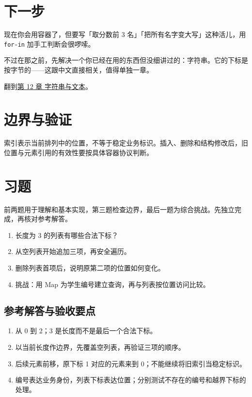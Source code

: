 \section{下一步}

现在你会用容器了，但要写「取分数前 3 名」「把所有名字变大写」这种活儿，用 \texttt{for-in} 加手工判断会很啰嗦。

不过在那之前，先解决一个你已经在用的东西但没细讲过的：字符串。它的下标是按字节的——这跟中文直接相关，值得单独一章。

翻到\hyperref[ch:12]{第 12 章 字符串与文本}。

\section{边界与验证}

索引表示当前排列中的位置，不等于稳定业务标识。插入、删除和结构修改后，旧位置与元素引用的有效性要按具体容器协议判断。

\section{习题}

前两题用于理解和基本实现，第三题检查边界，最后一题为综合挑战。先独立完成，再核对参考解答。

\begin{enumerate}

\item 长度为 3 的列表有哪些合法下标？

\item 从空列表开始追加三项，再安全遍历。

\item 删除列表首项后，说明原第二项的位置如何变化。

\item 挑战：用 Map 为学生编号建立查询，再与列表按位置访问比较。

\end{enumerate}

\subsection*{参考解答与验收要点}

\begin{enumerate}

\item 从 0 到 2；3 是长度而不是最后一个合法下标。

\item 以当前长度作边界，先覆盖空列表，再验证三项的顺序。

\item 后续元素前移，原下标 1 对应的元素来到 0；不能继续将旧索引当稳定标识。

\item 编号表达业务身份，列表下标表达位置；分别测试不存在的编号和越界下标的处理。

\end{enumerate}

